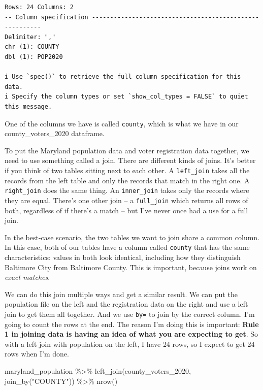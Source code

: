\documentclass[
  letterpaper,
  DIV=11,
  numbers=noendperiod]{scrreprt}
\newenvironment{Shaded}{\begin{snugshade}}{\end{snugshade}}
\newcommand{\FunctionTok}[1]{\textcolor[rgb]{0.28,0.35,0.67}{#1}}
\newcommand{\NormalTok}[1]{\textcolor[rgb]{0.00,0.23,0.31}{#1}}
\newcommand{\SpecialCharTok}[1]{\textcolor[rgb]{0.37,0.37,0.37}{#1}}
\newcommand{\StringTok}[1]{\textcolor[rgb]{0.13,0.47,0.30}{#1}}
\begin{document}
\begin{verbatim}
Rows: 24 Columns: 2
-- Column specification --------------------------------------------------------
Delimiter: ","
chr (1): COUNTY
dbl (1): POP2020

i Use `spec()` to retrieve the full column specification for this data.
i Specify the column types or set `show_col_types = FALSE` to quiet this message.
\end{verbatim}

One of the columns we have is called \texttt{county}, which is what we
have in our county\_voters\_2020 dataframe.

To put the Maryland population data and voter registration data
together, we need to use something called a join. There are different
kinds of joins. It's better if you think of two tables sitting next to
each other. A \texttt{left\_join} takes all the records from the left
table and only the records that match in the right one. A
\texttt{right\_join} does the same thing. An \texttt{inner\_join} takes
only the records where they are equal. There's one other join -- a
\texttt{full\_join} which returns all rows of both, regardless of if
there's a match -- but I've never once had a use for a full join.

In the best-case scenario, the two tables we want to join share a common
column. In this case, both of our tables have a column called
\texttt{county} that has the same characteristics: values in both look
identical, including how they distinguish Baltimore City from Baltimore
County. This is important, because joins work on \emph{exact matches}.

We can do this join multiple ways and get a similar result. We can put
the population file on the left and the registration data on the right
and use a left join to get them all together. And we use \texttt{by=} to
join by the correct column. I'm going to count the rows at the end. The
reason I'm doing this is important: \textbf{Rule 1 in joining data is
having an idea of what you are expecting to get}. So with a left join
with population on the left, I have 24 rows, so I expect to get 24 rows
when I'm done.

\begin{Shaded}
\begin{Highlighting}[]
\NormalTok{maryland\_population }\SpecialCharTok{\%\textgreater{}\%} \FunctionTok{left\_join}\NormalTok{(county\_voters\_2020, }\FunctionTok{join\_by}\NormalTok{(}\StringTok{"COUNTY"}\NormalTok{)) }\SpecialCharTok{\%\textgreater{}\%} \FunctionTok{nrow}\NormalTok{()}
\end{Highlighting}
\end{Shaded}
\end{document}
